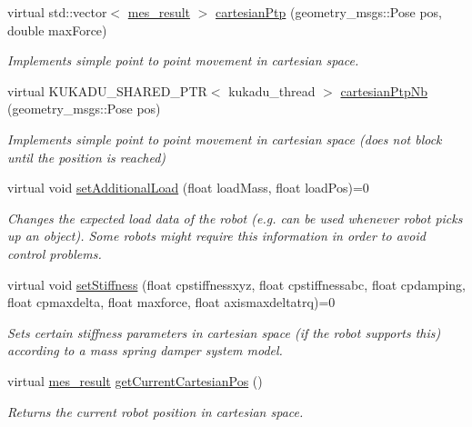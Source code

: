 \begin{DoxyCompactItemize}
virtual std\+::vector$<$ \hyperlink{structmes__result}{mes\+\_\+result} $>$ \hyperlink{classkukadu_1_1ControlQueue_a58518838c503e7eaa9c220bdf34ddd33}{cartesian\+Ptp} (geometry\+\_\+msgs\+::\+Pose pos, double max\+Force)
\begin{DoxyCompactList}\small\item\em Implements simple point to point movement in cartesian space. \end{DoxyCompactList}\item 
virtual K\+U\+K\+A\+D\+U\+\_\+\+S\+H\+A\+R\+E\+D\+\_\+\+P\+TR$<$ kukadu\+\_\+thread $>$ \hyperlink{classkukadu_1_1ControlQueue_a1c0ad5ad4d3af98f26d0c633181df010}{cartesian\+Ptp\+Nb} (geometry\+\_\+msgs\+::\+Pose pos)
\begin{DoxyCompactList}\small\item\em Implements simple point to point movement in cartesian space (does not block until the position is reached) \end{DoxyCompactList}\item 
virtual void \hyperlink{classkukadu_1_1ControlQueue_a18e628686b8c86abfdbd097b60aa5768}{set\+Additional\+Load} (float load\+Mass, float load\+Pos)=0
\begin{DoxyCompactList}\small\item\em Changes the expected load data of the robot (e.\+g. can be used whenever robot picks up an object). Some robots might require this information in order to avoid control problems. \end{DoxyCompactList}\item 
virtual void \hyperlink{classkukadu_1_1ControlQueue_aee25e6410909af34d740edbece98d677}{set\+Stiffness} (float cpstiffnessxyz, float cpstiffnessabc, float cpdamping, float cpmaxdelta, float maxforce, float axismaxdeltatrq)=0
\begin{DoxyCompactList}\small\item\em Sets certain stiffness parameters in cartesian space (if the robot supports this) according to a mass spring damper system model. \end{DoxyCompactList}\item 
virtual \hyperlink{structmes__result}{mes\+\_\+result} \hyperlink{classkukadu_1_1ControlQueue_abddacca2f9bf2db7a42a80d347843cec}{get\+Current\+Cartesian\+Pos} ()
\begin{DoxyCompactList}\small\item\em Returns the current robot position in cartesian space. \end{DoxyCompactList}\item 

\end{DoxyCompactItemize}
